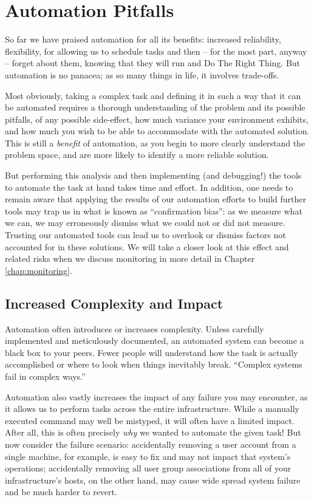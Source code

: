 \section{Automation Pitfalls}
\label{automation:pitfalls}

So far we have praised automation for all its
benefits: increased reliability, flexibility, for
allowing us to schedule tasks and then -- for the most
part, anyway -- forget about them, knowing that they
will run and Do The Right Thing.  But automation is no
panacea; as so many things in life, it involves
trade-offs.

Most obviously, taking a complex task and defining it
in such a way that it can be automated requires a
thorough understanding of the problem and its possible
pitfalls, of any possible side-effect, how much
variance your environment exhibits, and how much you
wish to be able to accommodate with the automated
solution.  This is still a {\em benefit} of
automation, as you begin to more clearly understand
the problem space, and are more likely to identify a
more reliable solution.

But performing this analysis and then implementing
(and debugging!) the tools to automate the task at
hand takes time and effort.  In addition, one needs to
remain aware that applying the results of our
automation efforts to build further tools may trap us
in what is known as ``confirmation bias'': as we measure what we can, we may
erroneously dismiss what we could not or did not
measure.  Trusting our automated tools can lead us to
overlook or dismiss factors not accounted for in these
solutions.  We will take a closer look at this effect
and related risks when we discuss monitoring in more
detail in Chapter \ref{chap:monitoring}.

\subsection{Increased Complexity and Impact}
\label{automation:pitfalls:complexity}

Automation often introduces or increases complexity.
Unless carefully implemented and meticulously
documented, an automated system can become a black box
to your peers.  Fewer people will understand how the
task is actually accomplished or where to look when
things inevitably break.  ``Complex systems fail in
complex ways.''\cite{automation:cook}

Automation also vastly increases the impact of any
failure you may encounter, as it allows us to perform
tasks across the entire infrastructure.  While a
manually executed command may well be mistyped, it
will often have a limited impact.  After all, this is
often precisely {\em why} we wanted to automate the
given task!  But now consider the failure scenario:
accidentally removing a user account from a single
machine, for example, is easy to fix and may not
impact that system's operations; accidentally removing
all user group associations from all of your
infrastructure's hosts, on the other hand, may cause
wide spread system failure and be much harder to
revert.

